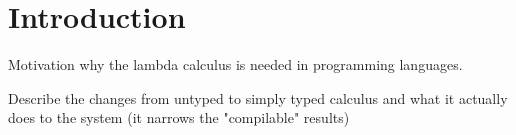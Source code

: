 \section{Introduction}

Motivation why the lambda calculus is needed in
programming languages.

Describe the changes from untyped to simply typed
calculus and what it actually does to the system
(it narrows the "compilable" results)

\cite{pierce2002ProgLang}
